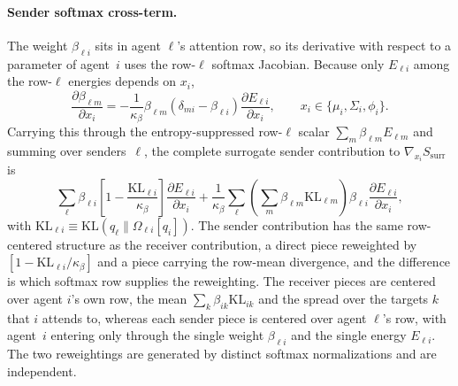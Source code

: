 \documentclass[11pt]{article}
\begin{document}
\paragraph{Sender softmax cross-term.}
The weight $\beta_{\ell i}$ sits in agent $\ell$'s attention row, so its derivative with respect to a parameter of agent~$i$ uses the row-$\ell$ softmax Jacobian. Because only $E_{\ell i}$ among the row-$\ell$ energies depends on $x_i$,
\begin{equation}
\frac{\partial \beta_{\ell m}}{\partial x_i} = -\frac{1}{\kappa_\beta}\beta_{\ell m}\left(\delta_{mi} - \beta_{\ell i}\right)\frac{\partial E_{\ell i}}{\partial x_i}, \qquad x_i \in \{\mu_i, \Sigma_i, \phi_i\}.
\label{eq:sender_softmax_entry}
\end{equation}
Carrying this through the entropy-suppressed row-$\ell$ scalar $\sum_m \beta_{\ell m}E_{\ell m}$ and summing over senders~$\ell$, the complete surrogate sender contribution to $\nabla_{x_i}S_{\mathrm{surr}}$ is
\begin{equation}
\sum_\ell \beta_{\ell i}\left[1 - \frac{\mathrm{KL}_{\ell i}}{\kappa_\beta}\right]\frac{\partial E_{\ell i}}{\partial x_i} + \frac{1}{\kappa_\beta}\sum_\ell \left(\sum_m \beta_{\ell m}\mathrm{KL}_{\ell m}\right)\beta_{\ell i}\frac{\partial E_{\ell i}}{\partial x_i},
\label{eq:sender_autograd}
\end{equation}
with $\mathrm{KL}_{\ell i} \equiv \mathrm{KL}(q_\ell \| \Omega_{\ell i}[q_i])$. The sender contribution has the same row-centered structure as the receiver contribution, a direct piece reweighted by $[1 - \mathrm{KL}_{\ell i}/\kappa_\beta]$ and a piece carrying the row-mean divergence, and the difference is which softmax row supplies the reweighting. The receiver pieces are centered over agent $i$'s own row, the mean $\sum_k \beta_{ik}\mathrm{KL}_{ik}$ and the spread over the targets $k$ that $i$ attends to, whereas each sender piece is centered over agent $\ell$'s row, with agent~$i$ entering only through the single weight $\beta_{\ell i}$ and the single energy $E_{\ell i}$. The two reweightings are generated by distinct softmax normalizations and are independent.
\end{document}

